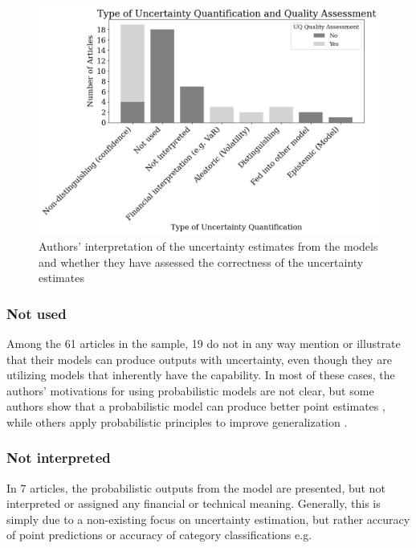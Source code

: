 \begin{figure}[H]
    \centering
    \includegraphics[width=1\linewidth]{Images/uncertainty_quantification_by_type_and_assessment.png}
    \caption{Authors' interpretation of the uncertainty estimates from the models and whether they have assessed the correctness of the uncertainty estimates}
    \label{fig:uncertainty_quantification_by_type_and_assessment}
\end{figure}


\subsubsection{Not used}

Among the 61 articles in the sample, 19 do not in any way mention or illustrate that their models can produce outputs with uncertainty, even though they are utilizing models that inherently have the capability. In most of these cases, the authors' motivations for using probabilistic models are not clear, but some authors show that a probabilistic model can produce better point estimates \parencite{Daniali2021, Papaioannou2022gpr, Park2014gpr}, while others apply probabilistic principles to improve generalization \textcite{jang2018generative}.

\subsubsection{Not interpreted}

In 7 articles, the probabilistic outputs from the model are presented, but not interpreted or assigned any financial or technical meaning. Generally, this is simply due to a non-existing focus on uncertainty estimation, but rather accuracy of point predictions \parencite{DeSpiegeleer2018gpr} or accuracy of category classifications e.g. \parencite{Malagrino2018Forecasting, Zhang2016}


